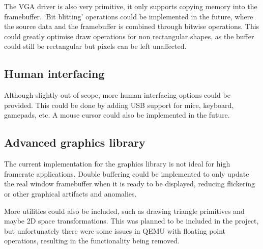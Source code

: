 The VGA driver is also very primitive, it only supports copying memory into the framebuffer.
`Bit blitting' operations could be implemented in the future, where the source data 
and the framebuffer is combined through bitwise operations. This could greatly optimise
draw operations for non rectangular shapes, as the buffer could still be rectangular
but pixels can be left unaffected.

\subsection{Human interfacing}
Although slightly out of scope, more human interfacing options could be provided. This
could be done by adding USB support for mice, keyboard, gamepads, etc. A mouse cursor
could also be implemented in the future. 

\subsection{Advanced graphics library}
The current implementation for the graphics library is not ideal for high framerate
applications. Double buffering could be implemented to only update the real window 
framebuffer when it is ready to be displayed, reducing flickering or other
graphical artifacts and anomalies.

More utilities could also be included, such as drawing triangle primitives and 
maybe 2D space transformations. This was planned to be included in the project,
but unfortunately there were some issues in QEMU with floating point operations,
resulting in the functionality being removed.


